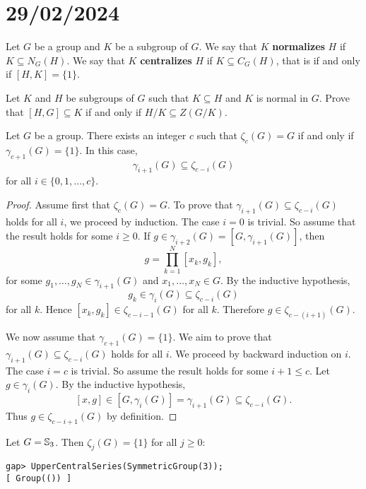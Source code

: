 \section{29/02/2024}



Let $G$ be a group and $K$ be a subgroup of $G$. We say that $K$ \textbf{normalizes} 
$H$ if $K\subseteq N_G(H)$.
We say that $K$ \textbf{centralizes} 
$H$ if $K\subseteq C_G(H)$, that is if and only if $[H,K]=\{1\}$.

\begin{exercise}
Let $K$ and $H$ be subgroups of $G$ such that $K\subseteq H$ and $K$ is normal in $G$.
Prove that $[H,G]\subseteq K$ if and only if $H/K\subseteq Z(G/K)$. 
\end{exercise}

\begin{lemma}
\label{lem:gamma_zeta}
Let $G$ be a group. There exists an integer $c$ such that 
$\zeta_c(G)=G$ if and only if 
$\gamma_{c+1}(G)=\{1\}$. In this case, 
\[
\gamma_{i+1}(G)\subseteq\zeta_{c-i}(G)
\]
for all $i\in\{0,1,\dots,c\}$. 
\end{lemma}

\begin{proof}
Assume first that $\zeta_c(G)=G$. To prove that 
$\gamma_{i+1}(G)\subseteq\zeta_{c-i}(G)$ holds for all $i$, we proceed by induction. 
The case $i=0$ is trivial. So assume that the result holds for some $i\geq0$. If
$g\in\gamma_{i+2}(G)=[G,\gamma_{i+1}(G)]$, then     
\[
g=\prod_{k=1}^N [x_k,g_k],
\]
for some $g_1,\dots,g_N\in\gamma_{i+1}(G)$ and $x_1,\dots,x_N\in G$. By the inductive 
hypothesis, 
	\[
	g_k\in\gamma_i(G)\subseteq\zeta_{c-i}(G)
	\]
for all $k$. Hence $[x_k,g_k]\in\zeta_{c-i-1}(G)$ for all $k$. Therefore   
$g\in\zeta_{c-(i+1)}(G)$. 
	
We now assume that $\gamma_{c+1}(G)=\{1\}$. We aim to prove that 
$\gamma_{i+1}(G)\subseteq\zeta_{c-i}(G)$ holds for all $i$. We proceed by backward induction on $i$. 
The case $i=c$ is trivial. So assume the result holds for some $i+1\leq c$. 
Let $g\in\gamma_{i}(G)$. By the inductive hypothesis, 
	\[
	[x,g]\in [G,\gamma_i(G)]=\gamma_{i+1}(G)\subseteq\zeta_{c-i}(G).
	\]
Thus $g\in\zeta_{c-i+1}(G)$ by definition. 
\end{proof}

\begin{example}
Let $G=\mathbb{S}_3$. Then $\zeta_j(G)=\{1\}$ for all $j\geq 0$: 
\begin{lstlisting}
gap> UpperCentralSeries(SymmetricGroup(3));
[ Group(()) ]
\end{lstlisting}
\end{example}

